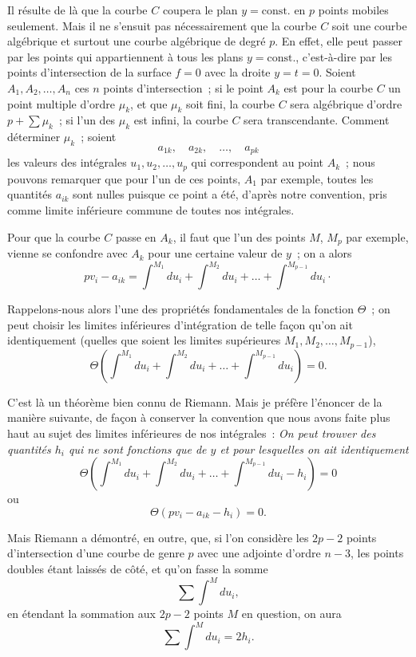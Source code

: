 \documentclass{article}
\begin{document}
Il résulte de là que la courbe $C$ coupera le plan $y = \text{const.}$ en $p$ points mobiles seulement. Mais il ne s'ensuit pas nécessairement que la courbe $C$ soit une courbe algébrique et surtout une courbe algébrique de degré $p$. En effet, elle peut passer par les points qui appartiennent à tous les plans $y = \text{const.}$, c'est-à-dire par les points d'intersection de la surface $f = 0$ avec la droite $y = t = 0$. Soient $A_{1}, A_{2}, \ldots, A_{n}$
ces $n$ points d'intersection~; si le point $A_{k}$ est pour la courbe $C$ un point multiple d'ordre $\mu_{k}$, et que $\mu_{k}$ soit fini, la courbe $C$ sera algébrique d'ordre $p + \displaystyle\sum \mu_{k}$~; si l'un des $\mu_{k}$ est infini, la courbe $C$ sera transcendante. Comment déterminer $\mu_{k}$~; soient
\[
a_{1k}, \quad a_{2k}, \quad \ldots, \quad a_{pk}
\]
les valeurs des intégrales $u_{1}, u_{2}, \ldots, u_{p}$ qui correspondent au point $A_{k}$~; nous pouvons remarquer que pour l'un de ces points, $A_{1}$ par exemple, toutes les quantités $a_{ik}$ sont nulles puisque ce point a été, d'après notre convention, pris comme limite inférieure commune de toutes nos intégrales.

Pour que la courbe $C$ passe en $A_{k}$, il faut que l'un des points $M$, $M_{p}$ par exemple, vienne se confondre avec $A_{k}$ pour une certaine valeur de $y$~; on a alors
\[
p v_{i} - a_{ik} = \int^{M_{1}} du_{i} + \int^{M_{2}} du_{i} + \ldots + \int^{M_{p-1}} du_{i} \cdot
\]

Rappelons-nous alors l'une des propriétés fondamentales de la fonction $\Theta$~; on peut choisir les limites inférieures d'intégration de telle façon qu'on ait identiquement (quelles que soient les limites supérieures $M_{1}, M_{2}, \ldots, M_{p-1}$),
\[
\Theta\left( \int^{M_{1}} du_{i} + \int^{M_{2}} du_{i} + \ldots + \int^{M_{p-1}} du_{i} \right) = 0.
\]

C'est là un théorème bien connu de Riemann. Mais je préfère l'énoncer de la manière suivante, de façon à conserver la convention que nous avons faite plus haut au sujet des limites inférieures de nos intégrales~: \emph{On peut trouver des quantités $h_{i}$ qui ne sont fonctions que de $y$ et pour lesquelles on ait identiquement}
\[
\Theta\left( \int^{M_{1}} du_{i} + \int^{M_{2}} du_{i} + \ldots + \int^{M_{p-1}} du_{i} - h_{i} \right) = 0
\]
ou
\[
\Theta(p v_{i} - a_{ik} - h_{i}) = 0. \tag{2}
\]

Mais Riemann a démontré, en outre, que, si l'on considère les $2p - 2$ points d'intersection d'une courbe de genre $p$ avec une adjointe d'ordre $n - 3$, les points doubles étant laissés de côté, et qu'on fasse la somme
\[
\sum \int^{M} du_{i}, \tag{3}
\]
en étendant la sommation aux $2p - 2$ points $M$ en question, on aura
\[
\sum \int^{M} du_{i} = 2 h_{i}. \tag{3 bis}
\]
\end{document}
